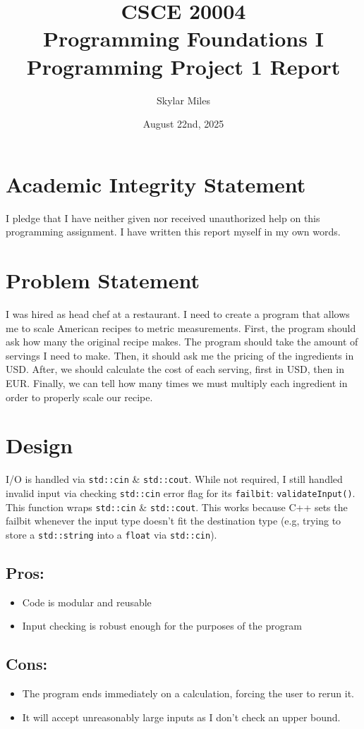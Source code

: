 \documentclass[12pt, letterpaper]{article}
\title{\vspace{-1in}CSCE 20004 \\ Programming Foundations I \\ Programming Project 1 Report}
\author{Skylar Miles}
\date{August 22nd, 2025}
\begin{document}
\maketitle

\section*{Academic Integrity Statement}
I pledge that I have neither given nor received unauthorized help on this programming assignment. I have written this report myself in my own words.

\section{Problem Statement}
I was hired as head chef at a restaurant. 
I need to create a program that allows me to scale American recipes
to metric measurements.
First, the program should ask how many the original recipe makes. 
The program should take the amount of servings I need to make. 
Then, it should ask me the pricing of the ingredients in USD. 
After, we should calculate the cost of each serving, first in USD, then in EUR. 
Finally, we can tell how many times we must multiply each ingredient in order to properly scale our recipe.

\section{Design}
I/O is handled via \texttt{std::cin} \& \texttt{std::cout}. While not required, I still handled invalid input via checking \texttt{std::cin} error flag for its \texttt{failbit}: \texttt{validateInput()}. This function wraps \texttt{std::cin} \& \texttt{std::cout}. This works because C++ sets the failbit whenever the input type doesn't fit the destination type (e.g, trying to store a \texttt{std::string} into a \texttt{float} via \texttt{std::cin}).

\medskip 
\subsection{Pros:}
\begin{itemize}
    \item Code is modular and reusable
    \item Input checking is robust enough for the purposes of the program
\end{itemize}
\subsection{Cons:}
\begin{itemize}
    \item The program ends immediately on a calculation, forcing the user to rerun it.
    \item It will accept unreasonably large inputs as I don't check an upper bound.
\end{itemize}
\end{document}
